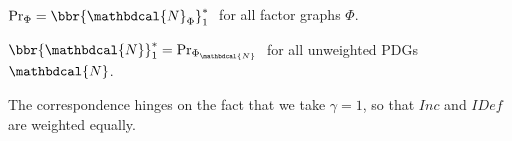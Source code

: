 \documentclass[letterpaper]{article} %
\theoremstyle{plain}
\theoremstyle{definition}
\theoremstyle{remark}
\newcommand{\begthm}[3][]{\begin{#2}[{name=#1},restate=#3,label=#3]}
\newcommand{\commentout}[1]{\ignorespaces}
\newcommand{\dg}[1]{\mathbdcal{#1}}
\newcommand{\IDef}[1]{\mathit{IDef}_{\!#1}}
\newcommand\Inc{\mathit{Inc}}
\newcommand{\PDGof}[1]{{\dg M}_{#1}}
\newcommand{\UPDGof}[1]{{\dg N}_{#1}}
\newcommand{\WFGof}[1]{\Psi_{{#1}}}
\newcommand{\FGof}[1]{\Phi_{{#1}}}
\newcommand\GFE{\mathit{G\mkern-4mu F\mkern-4.5mu E}}
\begin{document}
\commentout{
	\begthm{theorem}{thm:pdg-is-fg}
		If $\dg M$ is a PDG such that for some $\gamma >0$, we have that $\beta_L\!
		= \gamma$ for all  $L$, then
	$\bbr{\dg M}_{\gamma} = \gamma\,\GFE_{ \WFGof{\dg M} }$ and
	$\bbr{\dg M}_{\gamma}^* = \{\Pr_{ \WFGof{\dg M}} \}$.
	\end{theorem}
	\begthm{theorem}{thm:fg-is-pdg}
	Given a factor graph $\Phi$, 
	and a constant vector $\kappa = \{ k \}_{J \in \cal J}$ for some fixed $k$, then
	we have that
	$\GFE_{\Phi, \kappa} = \nicefrac{1}{k}\bbr{\PDGof{\Phi,\kappa}}_{k} + C$  
	for some constant $C$, so $\Pr_{\Phi, \kappa}$ is the unique element of 
	$\bbr{\PDGof{\Phi,\kappa}}_{k}^*$. 
	\end{theorem}
}%

\begthm{theorem}{thm:fg-is-pdg}
$\Pr_{\Phi} = \bbr{\UPDGof{\Phi}}_{1}^*\;$ for all factor graphs $\Phi$.
\end{theorem}
\begthm{theorem}{thm:pdg-is-fg}
$\bbr{\dg N}_{1}^* = \Pr_{\FGof{\dg N}}\;$ for all unweighted
	PDGs $\dg N$.  
\end{theorem}
The correspondence hinges on the fact that we take $\gamma=1$, so that $\Inc$ and $\IDef{}$ are weighted equally.
\end{document}
